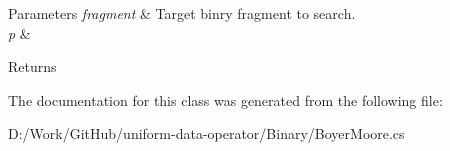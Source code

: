 \begin{DoxyParams}{Parameters}
{\em fragment} & Target binry fragment to search.\\
\hline
{\em p} & \\
\hline
\end{DoxyParams}
\begin{DoxyReturn}{Returns}

\end{DoxyReturn}


The documentation for this class was generated from the following file\+:\begin{DoxyCompactItemize}
\item 
D\+:/\+Work/\+Git\+Hub/uniform-\/data-\/operator/\+Binary/Boyer\+Moore.\+cs\end{DoxyCompactItemize}
